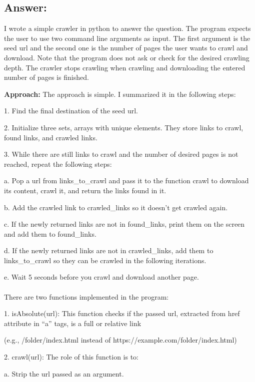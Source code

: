 \documentclass[a4paper, 11pt]{article}
\begin{document}
\subsection*{Answer:}
I wrote a simple crawler in python to answer the question. The program expects the user to use two command line arguments as input. The first argument is the seed url and the second one is the number of pages the user wants to crawl and download. Note that the program does not ask or check for the desired crawling depth. The crawler stops crawling when crawling and downloading the entered number of pages is finished.

\textbf{Approach:}
The approach is simple. I summarized it in the following steps:

1. Find the final destination of the seed url.

2. Initialize three sets, arrays with unique elements. They store links to crawl, found links, and crawled links.

3. While there are still links to crawl and the number of desired pages is not reached, repeat the following steps:

a. Pop a url from links\_to\_crawl and pass it to the function crawl to download its content, crawl it, and return the links found in it.

b. Add the crawled link to crawled\_links so it doesn't get crawled again.

c. If the newly returned links are not in found\_links, print them on the screen and add them to found\_links.

d. If the newly returned links are not in crawled\_links, add them to links\_to\_crawl so they can be crawled in the following iterations. 

e. Wait 5 seconds before you crawl and download another page.

\paragraph{}

There are two functions implemented in the program:

1. isAbsolute(url):
This function checks if the passed url, extracted from href attribute in ``a'' tags, is a full or relative link

(e.g., /folder/index.html instead of https://example.com/folder/index.html)

2. crawl(url):
The role of this function is to:

a. Strip the url passed as an argument.
\end{document}
